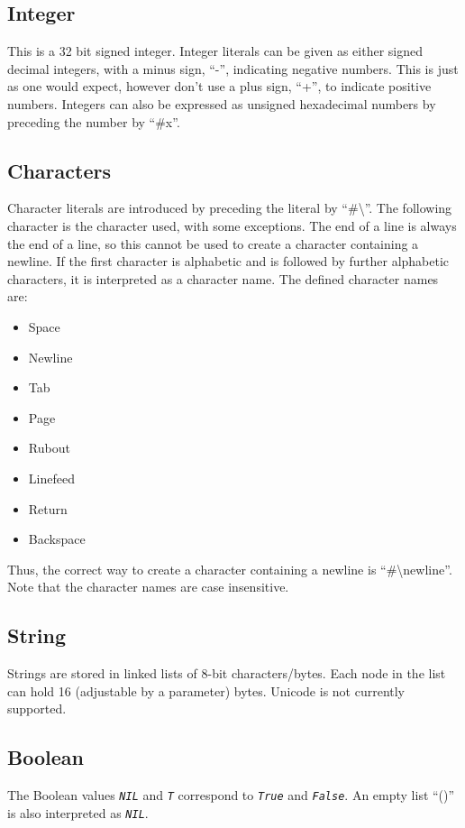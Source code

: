 \documentclass[10pt, openany]{book}
\newcommand{\constant}[1]{\emph{\texttt{#1}}}
\begin{document}
\subsection{Integer}
This is a 32 bit signed integer.  Integer literals can be given as either signed decimal integers, with a minus sign, ``-'', indicating negative numbers.  This is just as one would expect, however don't use a plus sign, ``+'', to indicate positive numbers.  Integers can also be expressed as unsigned hexadecimal numbers by preceding the number by ``\#x''.

\subsection{Characters}
Character literals are introduced by preceding the literal by ``\#\textbackslash''.  The following character is the character used, with some exceptions.  The end of a line is always the end of a line, so this cannot be used to create a character containing a newline.  If the first character is alphabetic and is followed by further alphabetic characters, it is interpreted as a character name.  The defined character names are:
\begin{itemize}
\item Space
\item Newline
\item Tab
\item Page
\item Rubout
\item Linefeed
\item Return
\item Backspace
\end{itemize}
Thus, the correct way to create a character containing a newline is ``\#\textbackslash{}newline''.  Note that the character names are case insensitive.

\subsection{String}
Strings are stored in linked lists of 8-bit characters/bytes.  Each node in the list can hold 16 (adjustable by a parameter) bytes.  Unicode is not currently supported.

\subsection{Boolean}
The Boolean values \constant{NIL} and \constant{T} correspond to \constant{True} and \constant{False}.  An empty list ``()'' is also interpreted as \constant{NIL}.
\end{document}
